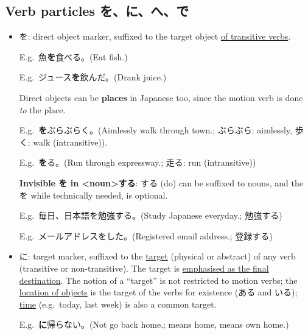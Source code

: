 \documentclass[../nihongo-gakushuu-kyouzai.tex]{subfiles}
\begin{document}
\subsection{Verb particles を、に、へ、で}\label{sec:verb-particles}
\begin{itemize}
    \item を: direct object marker, suffixed to the target object \ul{of transitive verbs}.

    E.g.\ 魚\textbf{を}食べる。(Eat fish.)

    E.g.\ ジュース\textbf{を}飲んだ。(Drank juice.)

    Direct objects can be \textbf{places} in Japanese too, since the motion verb is done \emph{to} the place. 

    E.g.\ \textbf{を}ぶらぶらく。(Aimlessly walk through town.; ぶらぶら: aimlessly, 歩く: walk (intransitive)).

    E.g.\ \textbf{を}る。(Run through expressway.; 走る: run (intransitive))

    \textbf{Invisible を in <noun>する}: する (do) can be suffixed to nouns, and the を while technically needed, is optional.

    E.g.\ 毎日、日本語を勉強\cancel{[を]}する。(Study Japanese everyday.; 勉強\cancel{[を]}する)

    E.g.\ メールアドレスを\cancel{[を]}した。(Registered email address.; 登録\cancel{[を]}する)
    \item に: target marker, suffixed to the \ul{target} (physical or abstract) of any verb (transitive or non-transitive). The target is \ul{emphasised as the final destination}. The notion of a ``target'' is not restricted to motion verbs; the \ul{location of objects} is the target of the verbs for existence (ある and いる); \ul{time} (e.g.\ today, last week) is also a common target.


    E.g.\ \textbf{に}帰らない。(Not go back home.;  means home,  means own home.)



\end{itemize}
\end{document}
